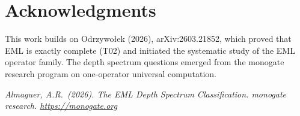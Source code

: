 \documentclass[12pt,a4paper]{article}
\theoremstyle{definition}
\theoremstyle{remark}
\begin{document}
\section*{Acknowledgments}

This work builds on Odrzywołek (2026), arXiv:2603.21852, which proved that
EML is exactly complete (T02) and initiated the systematic study of the
EML operator family.  The depth spectrum questions emerged from the monogate
research program on one-operator universal computation.

\bigskip
\noindent\textit{Almaguer, A.R.\ (2026). The EML Depth Spectrum Classification.
monogate research. \url{https://monogate.org}}
\end{document}
